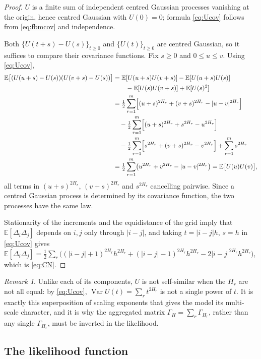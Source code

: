 \documentclass[11pt,reqno]{amsart}
\numberwithin{equation}{section}
\theoremstyle{plain}
\theoremstyle{definition}
\theoremstyle{remark}
\newtheorem{remark}[theorem]{Remark}
\newcommand{\GH}{\Gamma_H}
\newcommand{\E}{\mathbb{E}}
\DeclareMathOperator{\Var}{Var}
\begin{document}
\begin{proof}
$U$ is a finite sum of independent centred Gaussian processes vanishing at the origin,
hence centred Gaussian with $U(0)=0$; formula \eqref{eq:Ucov} follows from
\eqref{eq:fbmcov} and independence.

Both $\{U(t+s)-U(s)\}_{t\ge0}$ and $\{U(t)\}_{t\ge0}$ are centred Gaussian, so it
suffices to compare their covariance functions. Fix $s\ge0$ and $0\le u\le v$. Using
\eqref{eq:Ucov},
\begin{align*}
  \E\bigl[(U(u+s)-U(s))(U(v+s)-U(s))\bigr]
  &=\E[U(u+s)U(v+s)]-\E[U(u+s)U(s)]\\
  &\qquad-\E[U(s)U(v+s)]+\E[U(s)^{2}]\\
  &=\tfrac12\sum_{r=1}^{m}\Bigl[(u+s)^{2H_r}+(v+s)^{2H_r}-|u-v|^{2H_r}\Bigr]\\
  &\quad-\tfrac12\sum_{r=1}^{m}\Bigl[(u+s)^{2H_r}+s^{2H_r}-u^{2H_r}\Bigr]\\
  &\quad-\tfrac12\sum_{r=1}^{m}\Bigl[s^{2H_r}+(v+s)^{2H_r}-v^{2H_r}\Bigr]
        +\sum_{r=1}^{m}s^{2H_r}\\
  &=\tfrac12\sum_{r=1}^{m}\bigl(u^{2H_r}+v^{2H_r}-|u-v|^{2H_r}\bigr)
   =\E\bigl[U(u)U(v)\bigr],
\end{align*}
all terms in $(u+s)^{2H_r}$, $(v+s)^{2H_r}$ and $s^{2H_r}$ cancelling pairwise. Since a
centred Gaussian process is determined by its covariance function, the two processes have
the same law.

Stationarity of the increments and the equidistance of the grid imply that
$\E[\Delta_i\Delta_j]$ depends on $i,j$ only through $|i-j|$, and taking $t=|i-j|h$,
$s=h$ in \eqref{eq:Ucov} gives
$\E[\Delta_i\Delta_j]=\tfrac12\sum_r\bigl((|i-j|+1)^{2H_r}h^{2H_r}
+(|i-j|-1)^{2H_r}h^{2H_r}-2|i-j|^{2H_r}h^{2H_r}\bigr)$, which is \eqref{eq:CN}.
\end{proof}

\begin{remark}\label{re:notss}
Unlike each of its components, $U$ is not self-similar when the $H_r$ are not all equal:
by \eqref{eq:Ucov}, $\Var U(t)=\sum_rt^{2H_r}$ is not a single power of $t$. It is
exactly this superposition of scaling exponents that gives the model its multi-scale
character, and it is why the aggregated matrix $\GH=\sum_r\Gamma_{H_r}$, rather than any
single $\Gamma_{H_r}$, must be inverted in the likelihood.
\end{remark}

\subsection{The likelihood function}
\end{document}

